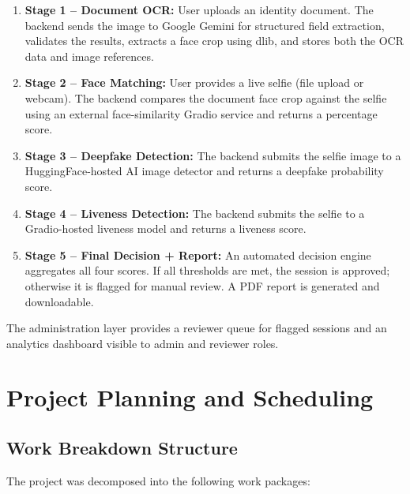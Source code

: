 \documentclass[12pt,a4paper]{report}
\begin{document}
\begin{enumerate}
    \item \textbf{Stage 1 -- Document OCR:} User uploads an identity document. The backend sends the image to Google Gemini for structured field extraction, validates the results, extracts a face crop using dlib, and stores both the OCR data and image references.
    \item \textbf{Stage 2 -- Face Matching:} User provides a live selfie (file upload or webcam). The backend compares the document face crop against the selfie using an external face-similarity Gradio service and returns a percentage score.
    \item \textbf{Stage 3 -- Deepfake Detection:} The backend submits the selfie image to a HuggingFace-hosted AI image detector and returns a deepfake probability score.
    \item \textbf{Stage 4 -- Liveness Detection:} The backend submits the selfie to a Gradio-hosted liveness model and returns a liveness score.
    \item \textbf{Stage 5 -- Final Decision + Report:} An automated decision engine aggregates all four scores. If all thresholds are met, the session is approved; otherwise it is flagged for manual review. A PDF report is generated and downloadable.
\end{enumerate}

The administration layer provides a reviewer queue for flagged sessions and an analytics dashboard visible to admin and reviewer roles.

\chapter{Project Planning and Scheduling}

\section{Work Breakdown Structure}

The project was decomposed into the following work packages:
\end{document}
